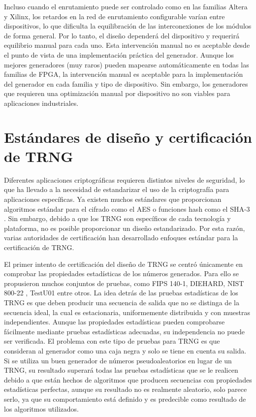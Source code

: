             Incluso cuando el enrutamiento puede ser controlado como en las familias Altera y Xilinx, los retardos en la red de enrutamiento configurable varían entre dispositivos, lo que dificulta la equilibración de las interconexiones de los módulos de forma general. Por lo tanto, el diseño dependerá del dispositivo y requerirá equilibrio manual para cada uno. Esta intervención manual no es aceptable desde el punto de vista de una implementación práctica del generador. Aunque los mejores generadores (muy raros) pueden mapearse automáticamente en todas las familias de FPGA, la intervención manual es aceptable para la implementación del generador en cada familia y tipo de dispositivo. Sin embargo, los generadores que requieren una optimización manual por dispositivo no son viables para aplicaciones industriales.
	
    \section{Estándares de diseño y certificación de TRNG}
	
	
            Diferentes aplicaciones criptográficas requieren distintos niveles de seguridad, lo que ha llevado a la necesidad de estandarizar el uso de la criptografía para aplicaciones específicas. Ya existen muchos estándares que proporcionan algoritmos estándar para el cifrado como el AES \cite{Dworkin2001, JoanDaemen2020} o funciones hash como el SHA-3 \cite{Dang2015}. Sin embargo, debido a que los TRNG son específicos de cada tecnología y plataforma, no es posible proporcionar un diseño estandarizado. Por esta razón, varias autoridades de certificación han desarrollado enfoques estándar para la certificación de TRNG.

            El primer intento de certificación del diseño de TRNG se centró únicamente en comprobar las propiedades estadísticas de los números generados. Para ello se propusieron muchos conjuntos de pruebas, como FIPS 140-1, DIEHARD, NIST 800-22 \cite{Nist2010}, TestU01 entre otros. La idea detrás de las pruebas estadísticas de los TRNG es que deben producir una secuencia de salida que no se distinga de la secuencia ideal, la cual es estacionaria, uniformemente distribuida y con muestras independientes. Aunque las propiedades estadísticas pueden comprobarse fácilmente mediante pruebas estadísticas adecuadas, su independencia no puede ser verificada. El problema con este tipo de pruebas para TRNG es que consideran al generador como una caja negra y solo se tiene en cuenta su salida. Si se utiliza un buen generador de números pseudoaleatorios en lugar de un TRNG, su resultado superará todas las pruebas estadísticas que se le realicen debido a que están hechos de algoritmos que producen secuencias con propiedades estadísticas perfectas, aunque su resultado no es realmente aleatorio, solo parece serlo, ya que su comportamiento está definido y es predecible como resultado de los algoritmos utilizados.

